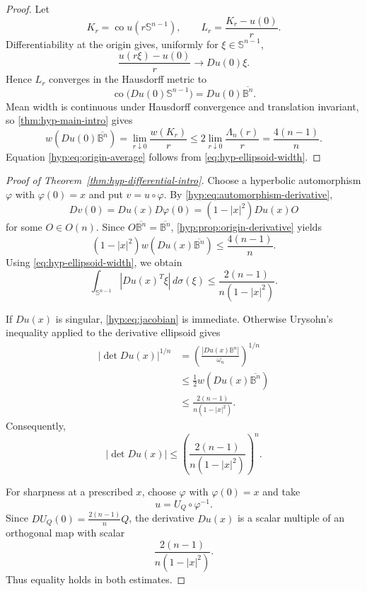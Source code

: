 \documentclass[11pt,reqno]{amsart}
\theoremstyle{remark}
\newcommand{\B}{\mathbb B}
\newcommand{\Sph}{\mathbb S}
\newcommand{\co}{\operatorname{co}}
\begin{document}
\begin{proof}
Let
\[
 K_r=\co u(r\Sph^{n-1}),
 \qquad
 L_r=\frac{K_r-u(0)}r.
\]
Differentiability at the origin gives, uniformly for $\xi\in\Sph^{n-1}$,
\[
 \frac{u(r\xi)-u(0)}r\longrightarrow Du(0)\xi.
\]
Hence $L_r$ converges in the Hausdorff metric to
\[
 \co\bigl(Du(0)\Sph^{n-1}\bigr)=Du(0)\overline{\B^n}.
\]
Mean width is continuous under Hausdorff convergence and translation invariant, so \cref{thm:hyp-main-intro} gives
\[
 w\!\left(Du(0)\overline{\B^n}\right)
 =\lim_{r\downarrow0}\frac{w(K_r)}r
 \le 2\lim_{r\downarrow0}\frac{\Lambda_n(r)}r
 =\frac{4(n-1)}n.
\]
Equation \eqref{hyp:eq:origin-average} follows from \eqref{eq:hyp-ellipsoid-width}.
\end{proof}

\begin{proof}[Proof of Theorem~\ref{thm:hyp-differential-intro}]
Choose a hyperbolic automorphism $\varphi$ with $\varphi(0)=x$ and put $v=u\circ\varphi$. By \eqref{hyp:eq:automorphism-derivative},
\[
 Dv(0)=Du(x)D\varphi(0)
 =(1-|x|^2)Du(x)O
\]
for some $O\in O(n)$. Since $O\overline{\B^n}=\overline{\B^n}$, \cref{hyp:prop:origin-derivative} yields
\[
 (1-|x|^2)w\!\left(Du(x)\overline{\B^n}\right)
 \le \frac{4(n-1)}n.
\]
Using \eqref{eq:hyp-ellipsoid-width}, we obtain
\begin{equation}\label{hyp:eq:average-derivative}
 \int_{\Sph^{n-1}}|Du(x)^T\xi|\,d\sigma(\xi)
 \le\frac{2(n-1)}{n(1-|x|^2)}.
\end{equation}

If $Du(x)$ is singular, \eqref{hyp:eq:jacobian} is immediate. Otherwise Urysohn's inequality applied to the derivative ellipsoid gives
\begin{align*}
 |\det Du(x)|^{1/n}
 &=\left(\frac{|Du(x)\B^n|}{\omega_n}\right)^{1/n}\\
 &\le \frac12w\!\left(Du(x)\overline{\B^n}\right)\\
 &\le\frac{2(n-1)}{n(1-|x|^2)}.
\end{align*}
Consequently,
\begin{equation}\label{hyp:eq:jacobian}
 |\det Du(x)|\le
 \left(\frac{2(n-1)}{n(1-|x|^2)}\right)^n.
\end{equation}

For sharpness at a prescribed $x$, choose $\varphi$ with $\varphi(0)=x$ and take
\[
 u=U_Q\circ\varphi^{-1}.
\]
Since $DU_Q(0)=\frac{2(n-1)}nQ$, the derivative $Du(x)$ is a scalar multiple of an orthogonal map with scalar
\[
 \frac{2(n-1)}{n(1-|x|^2)}.
\]
Thus equality holds in both estimates.
\end{proof}
\end{document}

